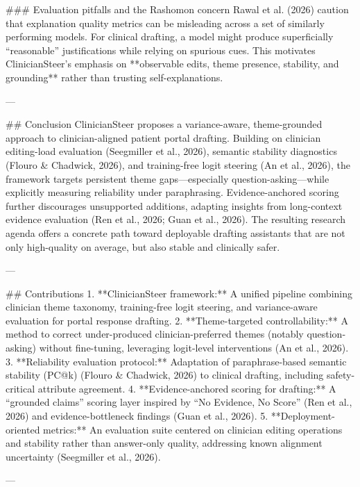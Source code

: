 ### Evaluation pitfalls and the Rashomon concern  
Rawal et al. (2026) caution that explanation quality metrics can be misleading across a set of similarly performing models. For clinical drafting, a model might produce superficially “reasonable” justifications while relying on spurious cues. This motivates ClinicianSteer’s emphasis on **observable edits, theme presence, stability, and grounding** rather than trusting self-explanations.

---

## Conclusion  
ClinicianSteer proposes a variance-aware, theme-grounded approach to clinician-aligned patient portal drafting. Building on clinician editing-load evaluation (Seegmiller et al., 2026), semantic stability diagnostics (Flouro & Chadwick, 2026), and training-free logit steering (An et al., 2026), the framework targets persistent theme gaps—especially question-asking—while explicitly measuring reliability under paraphrasing. Evidence-anchored scoring further discourages unsupported additions, adapting insights from long-context evidence evaluation (Ren et al., 2026; Guan et al., 2026). The resulting research agenda offers a concrete path toward deployable drafting assistants that are not only high-quality on average, but also stable and clinically safer.

---

## Contributions  
1. **ClinicianSteer framework:** A unified pipeline combining clinician theme taxonomy, training-free logit steering, and variance-aware evaluation for portal response drafting.  
2. **Theme-targeted controllability:** A method to correct under-produced clinician-preferred themes (notably question-asking) without fine-tuning, leveraging logit-level interventions (An et al., 2026).  
3. **Reliability evaluation protocol:** Adaptation of paraphrase-based semantic stability (PC@k) (Flouro & Chadwick, 2026) to clinical drafting, including safety-critical attribute agreement.  
4. **Evidence-anchored scoring for drafting:** A “grounded claims” scoring layer inspired by “No Evidence, No Score” (Ren et al., 2026) and evidence-bottleneck findings (Guan et al., 2026).  
5. **Deployment-oriented metrics:** An evaluation suite centered on clinician editing operations and stability rather than answer-only quality, addressing known alignment uncertainty (Seegmiller et al., 2026).

---